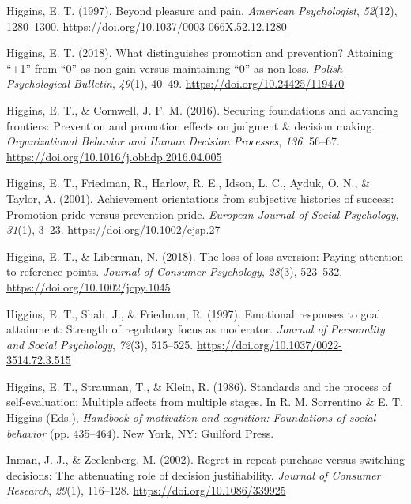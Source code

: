 \documentclass[man,floatsintext]{apa6}
\begin{document}
\leavevmode\hypertarget{ref-higgins1997}{}%
Higgins, E. T. (1997). Beyond pleasure and pain. \emph{American Psychologist}, \emph{52}(12), 1280--1300. \url{https://doi.org/10.1037/0003-066X.52.12.1280}

\leavevmode\hypertarget{ref-higgins2018}{}%
Higgins, E. T. (2018). What distinguishes promotion and prevention? Attaining ``+1'' from ``0'' as non-gain versus maintaining ``0'' as non-loss. \emph{Polish Psychological Bulletin}, \emph{49}(1), 40--49. \url{https://doi.org/10.24425/119470}

\leavevmode\hypertarget{ref-higginscornwell2016}{}%
Higgins, E. T., \& Cornwell, J. F. M. (2016). Securing foundations and advancing frontiers: Prevention and promotion effects on judgment \& decision making. \emph{Organizational Behavior and Human Decision Processes}, \emph{136}, 56--67. \url{https://doi.org/10.1016/j.obhdp.2016.04.005}

\leavevmode\hypertarget{ref-higginsetal2001}{}%
Higgins, E. T., Friedman, R., Harlow, R. E., Idson, L. C., Ayduk, O. N., \& Taylor, A. (2001). Achievement orientations from subjective histories of success: Promotion pride versus prevention pride. \emph{European Journal of Social Psychology}, \emph{31}(1), 3--23. \url{https://doi.org/10.1002/ejsp.27}

\leavevmode\hypertarget{ref-higginsliberman2018}{}%
Higgins, E. T., \& Liberman, N. (2018). The loss of loss aversion: Paying attention to reference points. \emph{Journal of Consumer Psychology}, \emph{28}(3), 523--532. \url{https://doi.org/10.1002/jcpy.1045}

\leavevmode\hypertarget{ref-higginsetal1997}{}%
Higgins, E. T., Shah, J., \& Friedman, R. (1997). Emotional responses to goal attainment: Strength of regulatory focus as moderator. \emph{Journal of Personality and Social Psychology}, \emph{72}(3), 515--525. \url{https://doi.org/10.1037/0022-3514.72.3.515}

\leavevmode\hypertarget{ref-higginsetal1986a}{}%
Higgins, E. T., Strauman, T., \& Klein, R. (1986). Standards and the process of self-evaluation: Multiple affects from multiple stages. In R. M. Sorrentino \& E. T. Higgins (Eds.), \emph{Handbook of motivation and cognition: Foundations of social behavior} (pp. 435--464). New York, NY: Guilford Press.

\leavevmode\hypertarget{ref-inmanzeelenberg2002}{}%
Inman, J. J., \& Zeelenberg, M. (2002). Regret in repeat purchase versus switching decisions: The attenuating role of decision justifiability. \emph{Journal of Consumer Research}, \emph{29}(1), 116--128. \url{https://doi.org/10.1086/339925}
\end{document}
